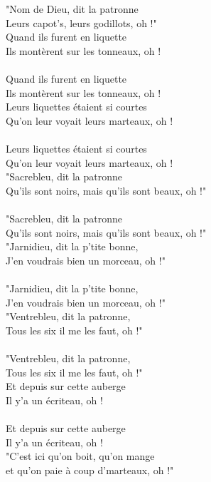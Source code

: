 \breakpage
\\\\"Nom de Dieu, dit la patronne
\\Leurs capot's, leurs godillots, oh !"
\\Quand ils furent en liquette
\\Ils montèrent sur les tonneaux, oh !
\\\\Quand ils furent en liquette
\\Ils montèrent sur les tonneaux, oh !
\\Leurs liquettes étaient si courtes
\\Qu'on leur voyait leurs marteaux, oh !
\\\\Leurs liquettes étaient si courtes
\\Qu'on leur voyait leurs marteaux, oh !
\\"Sacrebleu, dit la patronne
\\Qu'ils sont noirs, mais qu'ils sont beaux, oh !"
\\\\"Sacrebleu, dit la patronne
\\Qu'ils sont noirs, mais qu'ils sont beaux, oh !"
\\"Jarnidieu, dit la p'tite bonne,
\\J'en voudrais bien un morceau, oh !"
\\\\"Jarnidieu, dit la p'tite bonne,
\\J'en voudrais bien un morceau, oh !"
\\"Ventrebleu, dit la patronne,
\\Tous les six il me les faut, oh !"
\\\\"Ventrebleu, dit la patronne,
\\Tous les six il me les faut, oh !"
\\Et depuis sur cette auberge
\\Il y'a un écriteau, oh !
\\\\Et depuis sur cette auberge
\\Il y'a un écriteau, oh !
\\"C'est ici qu'on boit, qu'on mange
\\et qu'on paie à coup d'marteaux, oh !"

\breakpage